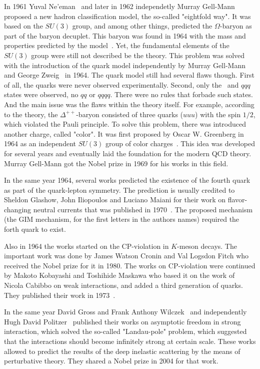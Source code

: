 In 1961 Yuval Ne'eman~\cite{lib:theory_qcd1} and later in 1962 independetly Murray Gell-Mann~\cite{lib:theory_qcd2} proposed a new hadron classification model, the so-called "eightfold way". It was based on the $SU(3)$ group, and among other things, predicted the $\Omega$-baryon as part of the baryon decuplet. This baryon was found in 1964 with the mass and properties predicted by the model~\cite{lib:theory_omega_b}. Yet, the fundamental elements of the $SU(3)$ group were still not described be the theory. This problem was solved with the introduction of the quark model independently by Murray Gell-Mann~\cite{lib:theory_quarks1} and George Zweig~\cite{lib:theory_quarks2} in 1964. The quark model still had several flaws though. First of all, the quarks were never observed experimentally. Second, only the \qqbar\ and $qqq$ states were observed, no $qq$ or $qqqq$. There were no rules that forbade such states. And the main issue was the flaws within the theory itself. For example, according to the theory, the $\Delta^{++}$-baryon consisted of three quarks ($uuu$) with the spin $1/2$, which violated the Pauli principle. To solve this problem, there was introduced another charge, called "color". It was first proposed by Oscar W. Greenberg in 1964 as an independent $SU(3)$ group of color charges~\cite{lib:theory_qcd_color}. This idea was developed for several years and eventually laid the foundation for the modern QCD theory. Murray Gell-Mann got the Nobel prize in 1969 for his works in this field.

In the same year 1964, several works predicted the existence of the fourth quark as part of the quark-lepton symmetry. The prediction is usually credited to Sheldon Glashow, John Iliopoulos and Luciano Maiani for their work on flavor-changing neutral currents that was published in 1970~\cite{lib:theory_GIM}. The proposed mechanism (the GIM mechanism, for the first letters in the authors names) required the forth quark to exist.

Also in 1964 the works started on the CP-violation in $K$-meson decays. The important work was done by James Watson Cronin and Val Logsdon Fitch who received the Nobel prize for it in 1980. The works on CP-violation were continued by Makoto Kobayashi and Toshihide Maskawa who based it on the work of Nicola Cabibbo on weak interactions, and added a third generation of quarks. They published their work in 1973~\cite{lib:theory_CKM}.

In the same year David Gross and Frank Anthony Wilczek~\cite{lib:theory_qcd_asymp1} and independently Hugh David Politzer~\cite{lib:theory_qcd_asymp2} published their works on asymptotic freedom in strong interaction, which solved the so-called "Landau-pole" problem, which suggested that the interactions should become infinitely strong at certain scale. These works allowed to predict the results of the deep inelastic scattering by the means of perturbative theory. They shared a Nobel prize in 2004 for that work.

